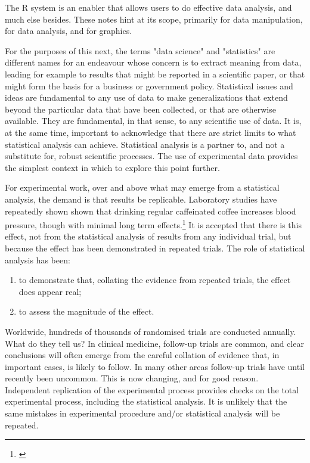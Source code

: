 The R system is an enabler that allows users to do effective
data analysis, and much else besides.  These notes hint at
its scope, primarily for data manipulation, for data analysis,
and for graphics. 

For the purposes of this next, the terms "data science" and
"statistics" are different names for an endeavour whose concern
is to extract meaning from data, leading for example to results
that might be reported in a scientific paper, or that might form
the basis for a business or government policy.  Statistical
issues and ideas are fundamental to any use of data to make
generalizations that extend beyond the particular data that
have been collected, or that are otherwise available.  They are
fundamental, in that sense, to any scientific use of data.
It is, at the same time, important to acknowledge that there
are strict limits to what statistical analysis can achieve.
Statistical analysis is a partner to, and not a substitute
for, robust scientific processes.  The use of experimental data
provides the simplest context in which to explore this point
further.

For experimental work, over and above what may emerge from a
statistical analysis, the demand is that results be replicable.
Laboratory studies have repeatedly shown shown that drinking
regular caffeinated coffee increases blood pressure, though
with minimal long term effects.\footnote{\citet{green_kirby_suls_1996}
}  It is accepted that there is
this effect, not from the statistical analysis of results from
any individual trial, but because the effect has been demonstrated
in repeated trials.  The role of statistical analysis has been:
\begin{enumerate}
\tightlist
\item to demonstrate that, collating the evidence from repeated
trials, the effect does appear real; 
\item to assess the magnitude of the effect.
\end{enumerate}

Worldwide, hundreds of thousands of randomised trials are
conducted annually.  What do they tell us?  In clinical medicine,
follow-up trials are common, and clear conclusions will often
emerge from the careful collation of evidence that, in important
cases, is likely to follow.  In many other areas follow-up trials
have until recently been uncommon. This is now changing, and for
good reason.  Independent replication of the experimental process
provides checks on the total experimental process, including the
statistical analysis.  It is unlikely that the same mistakes in
experimental procedure and/or statistical analysis will be repeated.

